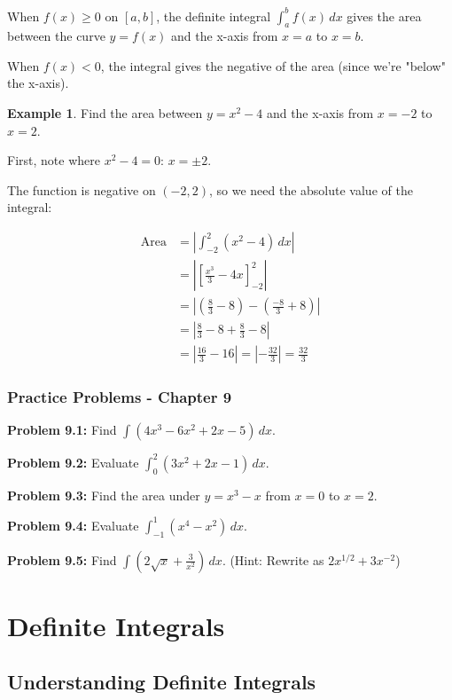 \documentclass[12pt,a4paper]{book}
\theoremstyle{definition}
\newtheorem{example}{Example}[chapter]
\begin{document}
\begin{intuition}
When $f(x) \geq 0$ on $[a,b]$, the definite integral $\int_a^b f(x) \, dx$ gives the area between the curve $y = f(x)$ and the x-axis from $x = a$ to $x = b$.

When $f(x) < 0$, the integral gives the negative of the area (since we're "below" the x-axis).
\end{intuition}

\begin{example}
Find the area between $y = x^2 - 4$ and the x-axis from $x = -2$ to $x = 2$.

First, note where $x^2 - 4 = 0$: $x = \pm 2$.

The function is negative on $(-2, 2)$, so we need the absolute value of the integral:

\begin{align}
\text{Area} &= \left| \int_{-2}^2 (x^2 - 4) \, dx \right|\\
&= \left| \left[ \frac{x^3}{3} - 4x \right]_{-2}^2 \right|\\
&= \left| \left(\frac{8}{3} - 8\right) - \left(\frac{-8}{3} + 8\right) \right|\\
&= \left| \frac{8}{3} - 8 + \frac{8}{3} - 8 \right|\\
&= \left| \frac{16}{3} - 16 \right| = \left| -\frac{32}{3} \right| = \frac{32}{3}
\end{align}
\end{example}

\subsection{Practice Problems - Chapter 9}

\textbf{Problem 9.1:} Find $\int (4x^3 - 6x^2 + 2x - 5) \, dx$.

\textbf{Problem 9.2:} Evaluate $\int_0^2 (3x^2 + 2x - 1) \, dx$.

\textbf{Problem 9.3:} Find the area under $y = x^3 - x$ from $x = 0$ to $x = 2$.

\textbf{Problem 9.4:} Evaluate $\int_{-1}^1 (x^4 - x^2) \, dx$.

\textbf{Problem 9.5:} Find $\int (2\sqrt{x} + \frac{3}{x^2}) \, dx$. (Hint: Rewrite as $2x^{1/2} + 3x^{-2}$)

\chapter{Definite Integrals}

\section{Understanding Definite Integrals}
\end{document}
